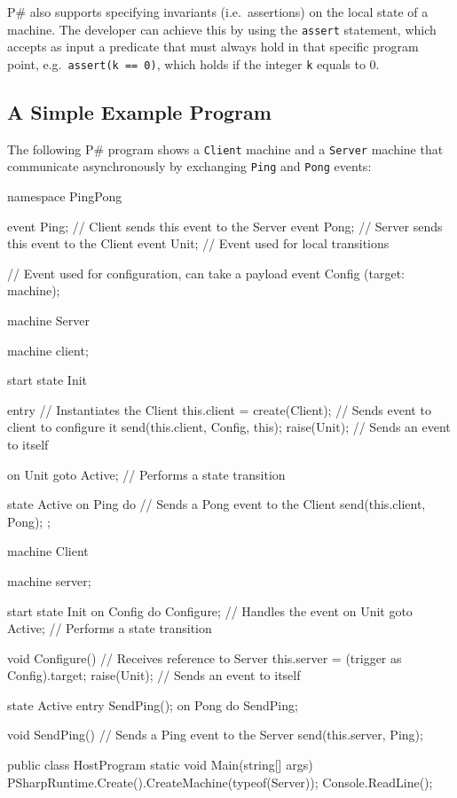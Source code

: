 \documentclass{llncs}
\newcommand{\ps}{P\#\xspace}
\begin{document}
\ps also supports specifying invariants (i.e.\ assertions) on the local state of a machine. The developer can achieve this by using the \texttt{assert} statement, which accepts as input a predicate that must always hold in that specific program point, e.g.\ \texttt{assert(k == 0)}, which holds if the integer \texttt{k} equals to 0.

\subsection{A Simple Example Program}
\label{sec:basics:example}

The following \ps program shows a \texttt{Client} machine and a \texttt{Server} machine that communicate asynchronously by exchanging \texttt{Ping} and \texttt{Pong} events:

\begin{psharp}
namespace PingPong {
  event Ping; // Client sends this event to the Server
  event Pong; // Server sends this event to the Client
  event Unit; // Event used for local transitions
  
  // Event used for configuration, can take a payload
  event Config (target: machine);
  
  machine Server {
    machine client;
  
    start state Init {
      entry {
        // Instantiates the Client
        this.client = create(Client);
        // Sends event to client to configure it
        send(this.client, Config, this);
        raise(Unit); // Sends an event to itself
      }
      
      on Unit goto Active; // Performs a state transition
    }
  
    state Active {
      on Ping do {
        // Sends a Pong event to the Client
        send(this.client, Pong);
      };
    }
  }
  
  machine Client {
    machine server;
  
    start state Init {
      on Config do Configure; // Handles the event
      on Unit goto Active; // Performs a state transition
    }
    
    void Configure() {
      // Receives reference to Server
      this.server = (trigger as Config).target;
      raise(Unit); // Sends an event to itself
    }
  
    state Active {
      entry {
        SendPing();
      }
      on Pong do SendPing;
    }
  
    void SendPing() {
      // Sends a Ping event to the Server
      send(this.server, Ping);
    }
  }
  
  public class HostProgram {
    static void Main(string[] args) {
      PSharpRuntime.Create().CreateMachine(typeof(Server));
      Console.ReadLine();
    }
  }
}
\end{psharp}
\end{document}
